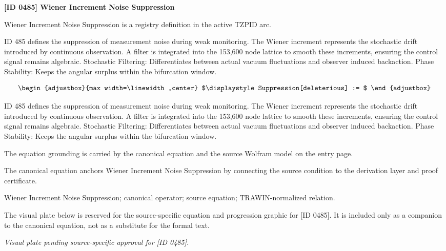 \clearpage
\noindent\textbf{[ID 0485] Wiener Increment Noise Suppression}\par
\vspace{0.35em}
\begingroup\small
{}
Wiener Increment Noise Suppression is a registry definition in the active TZPID arc.

ID 485 defines the suppression of measurement noise during weak monitoring. The Wiener increment represents the stochastic drift introduced by continuous observation. A filter is integrated into the 153,600 node lattice to smooth these increments, ensuring the control signal remains algebraic. Stochastic Filtering: Differentiates between actual vacuum fluctuations and observer induced backaction. Phase Stability: Keeps the angular surplus within the bifurcation window.

\[
\begin{adjustbox}{max width=\linewidth,center}
$\displaystyle
Suppression[deleterious] :=
$
\end{adjustbox}
\]

ID 485 defines the suppression of measurement noise during weak monitoring. The Wiener increment represents the stochastic drift introduced by continuous observation. A filter is integrated into the 153,600 node lattice to smooth these increments, ensuring the control signal remains algebraic. Stochastic Filtering: Differentiates between actual vacuum fluctuations and observer induced backaction. Phase Stability: Keeps the angular surplus within the bifurcation window.

The equation grounding is carried by the canonical equation and the source Wolfram model on the entry page.

The canonical equation anchors Wiener Increment Noise Suppression by connecting the source condition to the derivation layer and proof certificate.

Wiener Increment Noise Suppression; canonical operator; source equation; TRAWIN-normalized relation.
\endgroup

\begingroup\footnotesize\sloppy
The visual plate below is reserved for the source-specific equation and progression graphic for [ID 0485]. It is included only as a companion to the canonical equation, not as a substitute for the formal text.
\par\endgroup
\begingroup\footnotesize\itshape
Visual plate pending source-specific approval for [ID 0485].
\par\endgroup

